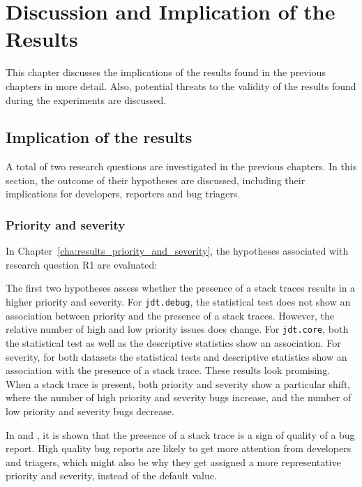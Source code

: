 
\chapter{Discussion and Implication of the Results} %
\label{cha:discussion_implication_of_the_results}
This chapter discusses the implications of the results found in the previous chapters in more detail. Also, potential threats to the validity of the results found during the experiments are discussed.

\section{Implication of the results} %
\label{sec:implication_of_the_results}
A total of two research questions are investigated in the previous chapters. In this section, the outcome of their hypotheses are discussed, including their implications for developers, reporters and bug triagers.

\subsection{Priority and severity} %
In Chapter~\ref{cha:results_priority_and_severity}, the hypotheses associated with research question R1 are evaluated:

\vspace{\baselineskip}
\questiona{}
\vspace{\baselineskip}

The first two hypotheses assess whether the presence of a stack traces results in a higher priority and severity. For \texttt{jdt.debug}, the statistical test does not show an association between priority and the presence of a stack traces. However, the relative number of high and low priority issues does change. For \texttt{jdt.core}, both the statistical test as well as the descriptive statistics show an association. For severity, for both datasets the statistical tests and descriptive statistics show an association with the presence of a stack trace. These results look promising. When a stack trace is present, both priority and severity show a particular shift, where the number of high priority and severity bugs increase, and the number of low priority and severity bugs decrease.

In \cite{Bettenburg2007} and \cite{Zimmermann2010}, it is shown that the presence of a stack trace is a sign of quality of a bug report. High quality bug reports are likely to get more attention from developers and triagers, which might also be why they get assigned a more representative priority and severity, instead of the default value.

